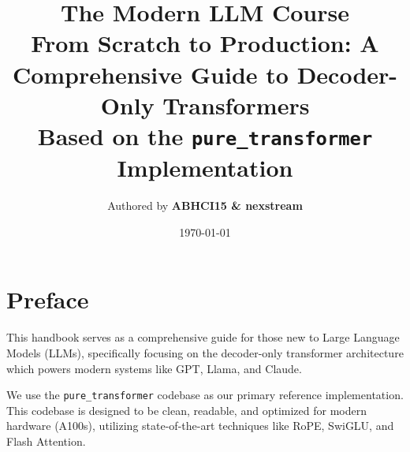 \documentclass[11pt, a4paper]{report}
\title{
    \textbf{\Huge The Modern LLM Course} \\
    \vspace{1cm}
    \Large From Scratch to Production: A Comprehensive Guide to Decoder-Only Transformers \\
    \vspace{0.5cm}
    \large Based on the \texttt{pure\_transformer} Implementation
}
\author{Authored by \textbf{ABHCI15 \& nexstream}}
\date{\today}
\begin{document}
\maketitle
\tableofcontents
\newpage

\chapter*{Preface}
This handbook serves as a comprehensive guide for those new to Large Language Models (LLMs), specifically focusing on the decoder-only transformer architecture which powers modern systems like GPT, Llama, and Claude.

We use the \texttt{pure\_transformer} codebase as our primary reference implementation. This codebase is designed to be clean, readable, and optimized for modern hardware (A100s), utilizing state-of-the-art techniques like RoPE, SwiGLU, and Flash Attention.









\end{document}
